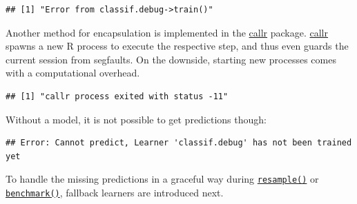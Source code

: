 \documentclass[
]{scrbook}
\newenvironment{Shaded}{\begin{snugshade}}{\end{snugshade}}
\newcommand{\AttributeTok}[1]{\textcolor[rgb]{0.77,0.63,0.00}{#1}}
\newcommand{\DecValTok}[1]{\textcolor[rgb]{0.00,0.00,0.81}{#1}}
\newcommand{\FunctionTok}[1]{\textcolor[rgb]{0.00,0.00,0.00}{#1}}
\newcommand{\NormalTok}[1]{#1}
\newcommand{\OtherTok}[1]{\textcolor[rgb]{0.56,0.35,0.01}{#1}}
\newcommand{\SpecialCharTok}[1]{\textcolor[rgb]{0.00,0.00,0.00}{#1}}
\newcommand{\StringTok}[1]{\textcolor[rgb]{0.31,0.60,0.02}{#1}}
\renewenvironment{Shaded} {\begin{snugshade}\small} {\end{snugshade}}
\begin{document}
\begin{verbatim}
## [1] "Error from classif.debug->train()"
\end{verbatim}

Another method for encapsulation is implemented in the \href{https://cran.r-project.org/package=callr}{callr} package.
\href{https://cran.r-project.org/package=callr}{callr} spawns a new R process to execute the respective step, and thus even guards the current session from segfaults.
On the downside, starting new processes comes with a computational overhead.

\begin{Shaded}
\end{Shaded}

\begin{verbatim}
## [1] "callr process exited with status -11"
\end{verbatim}

Without a model, it is not possible to get predictions though:

\begin{Shaded}
\end{Shaded}

\begin{verbatim}
## Error: Cannot predict, Learner 'classif.debug' has not been trained yet
\end{verbatim}

To handle the missing predictions in a graceful way during \href{https://mlr3.mlr-org.com/reference/resample.html}{\texttt{resample()}} or \href{https://mlr3.mlr-org.com/reference/benchmark.html}{\texttt{benchmark()}}, fallback learners are introduced next.
\end{document}
